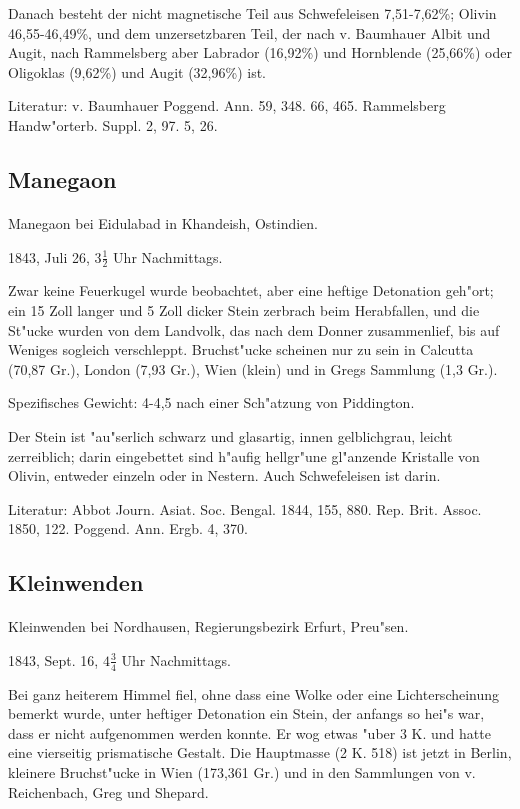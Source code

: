 \documentclass[a4paper, 11pt, oneside]{article}
\begin{document}
Danach besteht der nicht magnetische Teil aus Schwefeleisen 7,51-7,62\%; Olivin 46,55-46,49\%, und dem unzersetzbaren Teil, der nach v. Baumhauer Albit und Augit, nach Rammelsberg aber Labrador (16,92\%) und Hornblende (25,66\%) oder Oligoklas (9,62\%) und Augit (32,96\%) ist.

\footnotesize
Literatur: v. Baumhauer Poggend. Ann. 59, 348. 66, 465. Rammelsberg Handw"orterb. Suppl. 2, 97. 5, 26.

\subsection{Manegaon}
\normalsize
\paragraph{}
Manegaon bei Eidulabad in Khandeish, Ostindien.

1843, Juli 26, $3\frac{1}{2}$ Uhr Nachmittags.

Zwar keine Feuerkugel wurde beobachtet, aber eine heftige Detonation geh"ort; ein 15 Zoll langer und 5 Zoll dicker Stein zerbrach beim Herabfallen, und die St"ucke wurden von dem Landvolk, das nach dem Donner zusammenlief, bis auf Weniges sogleich verschleppt. Bruchst"ucke scheinen nur zu sein in Calcutta (70,87 Gr.), London (7,93 Gr.), Wien (klein) und in Gregs Sammlung (1,3 Gr.).

Spezifisches Gewicht: 4-4,5 nach einer Sch"atzung von Piddington.

Der Stein ist "au"serlich schwarz und glasartig, innen gelblichgrau, leicht zerreiblich; darin eingebettet sind h"aufig hellgr"une gl"anzende Kristalle von Olivin, entweder einzeln oder in Nestern. Auch Schwefeleisen ist darin.

\footnotesize
Literatur: Abbot Journ. Asiat. Soc. Bengal. 1844, 155, 880. Rep. Brit. Assoc. 1850, 122. Poggend. Ann. Ergb. 4, 370.

\subsection{Kleinwenden}
\normalsize
\paragraph{}
Kleinwenden bei Nordhausen, Regierungsbezirk Erfurt, Preu"sen.

1843, Sept. 16, $4\frac{3}{4}$ Uhr Nachmittags.

Bei ganz heiterem Himmel fiel, ohne dass eine Wolke oder eine Lichterscheinung bemerkt wurde, unter heftiger Detonation ein Stein, der anfangs so hei"s war, dass er nicht aufgenommen werden konnte. Er wog etwas "uber 3 K. und hatte eine vierseitig prismatische Gestalt. Die Hauptmasse (2 K. 518) ist jetzt in Berlin, kleinere Bruchst"ucke in Wien (173,361 Gr.) und in den Sammlungen von v. Reichenbach, Greg und Shepard.
\end{document}
